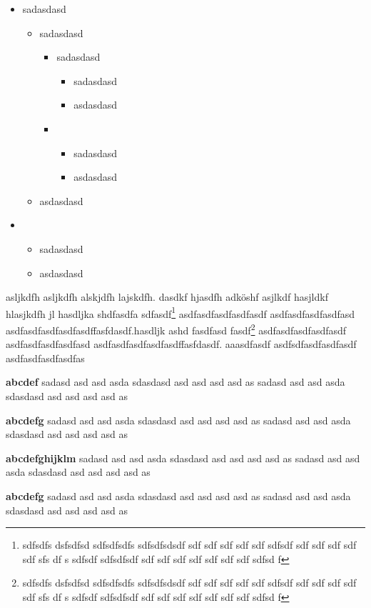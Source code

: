 \documentclass[ngerman,pdf]{wkcms}    %
\begin{document}
\begin{itemize}
  \item sadasdasd
       \begin{itemize}
          \item sadasdasd
                \begin{itemize}
                   \item sadasdasd
                         \begin{itemize}
                            \item sadasdasd
                            \item asdasdasd
                         \end{itemize}
                   \item \begin{itemize}
                            \item sadasdasd
                            \item asdasdasd
                         \end{itemize}
                \end{itemize}
          \item asdasdasd
       \end{itemize}
  \item
       \begin{itemize}
          \item sadasdasd
          \item asdasdasd
       \end{itemize}
\end{itemize}

\newpage 

asljkdfh asljkdfh alskjdfh lajskdfh. dasdkf hjasdfh adköshf asjlkdf
hasjldkf hlasjkdfh jl hasdljka shdfasdfa sdfasdf\footnote{sdfsdfs dsfsdfsd
  sdfsdfsdfs sdfsdfsdsdf sdf sdf sdf sdf sdf sdfsdf sdf sdf sdf sdf sdf sfs df
  s sdfsdf sdfsdfsdf sdf sdf sdf sdf sdf sdf sdf sdfsd f }
asdfasdfasdfasdfasdf asdfasdfasdfasdfasd
asdfasdfasdfasdfasdffasfdasdf.hasdljk ashd fasdfasd fasdf\footnote{sdfsdfs
  dsfsdfsd sdfsdfsdfs sdfsdfsdsdf sdf sdf sdf sdf sdf sdfsdf sdf sdf sdf sdf
  sdf sfs df s sdfsdf sdfsdfsdf sdf sdf sdf sdf sdf sdf sdf sdfsd f }
asdfasdfasdfasdfasdf asdfasdfasdfasdfasd asdfasdfasdfasdfasdffasfdasdf.
aaasdfasdf asdfsdfasdfasdfasdf asdfasdfasdfasdfas
\begin{longitemize}
  \item[\textbf{abcdef}]  sadasd asd asd asda sdasdasd asd asd asd asd as 
                          sadasd asd asd asda sdasdasd asd asd asd asd as
  \item[\textbf{abcdefg}] sadasd asd asd asda sdasdasd asd asd asd asd as
                          sadasd asd asd asda sdasdasd asd asd asd asd as
  \item[\textbf{abcdefghijklm}]
                          sadasd asd asd asda sdasdasd asd asd asd asd as
                          sadasd asd asd asda sdasdasd asd asd asd asd as
  \item[\textbf{abcdefg}] sadasd asd asd asda sdasdasd asd asd asd asd as
                          sadasd asd asd asda sdasdasd asd asd asd asd as
\end{longitemize}
\end{document}
